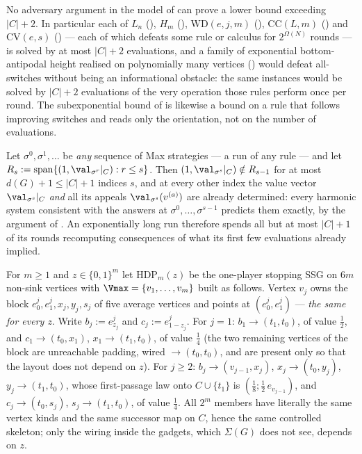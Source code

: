 \begin{corollary}\label{cor:qm-nobarrier}
No adversary argument in the model of  can prove a
lower bound exceeding $|C|+2$.  In particular each of $L_n$
(), $H_m$ (), $\mathrm{WD}(e,j,m)$
(), $\mathrm{CC}(L,m)$ ()
and $\mathrm{CV}(e,s)$ () --- each of which defeats some
rule or calculus for $2^{\Omega(N)}$ rounds --- is solved by at most
$|C|+2$ evaluations, and a family of exponential bottom-antipodal height
realised on polynomially many vertices () would
defeat all-switches without being an informational obstacle: the same
instances would be solved by $|C|+2$ evaluations of the very operation
those rules perform once per round.  The subexponential bound of
 is likewise a bound on a rule that follows improving
switches and reads only the orientation, not on the number of evaluations.
\end{corollary}

\begin{corollary}\label{cor:qm-runs}
Let $\sigma^{0},\sigma^{1},\dots$ be \emph{any} sequence of Max strategies
--- a run of any rule --- and let
$R_s:=\operatorname{span}\{(1,\val_{\sigma^{r}}|_C):r\le s\}$.  Then
$(1,\val_{\sigma^{s}}|_C)\notin R_{s-1}$ for at most $d(G)+1\le|C|+1$
indices $s$, and at every other index the value vector $\val_{\sigma^{s}}|_C$
\emph{and} all its appeals $\val_{\sigma^{s}}(v^{(a)})$ are already
determined: every harmonic system consistent with the answers at
$\sigma^{0},\dots,\sigma^{s-1}$ predicts them exactly, by the argument of
.  An exponentially long run therefore spends all but at
most $|C|+1$ of its rounds recomputing consequences of what its first few
evaluations already implied.
\end{corollary}

\begin{definition}\label{def:qm-hdp}
For $m\ge1$ and $z\in\{0,1\}^{m}$ let $\mathrm{HDP}_m(z)$ be the one-player
stopping SSG on $6m$ non-sink vertices with $\Vmax=\{v_1,\dots,v_m\}$
built as follows.  Vertex $v_j$ owns the block
$e^{j}_0,e^{j}_1,x_j,y_j,s_j$ of five average vertices and points at
$(e^{j}_0,e^{j}_1)$ --- \emph{the same for every $z$}.  Write
$b_j:=e^{j}_{z_j}$ and $c_j:=e^{j}_{1-z_j}$.  For $j=1$:
$b_1\to(t_1,t_0)$, of value $\tfrac12$, and $c_1\to(t_0,x_1)$,
$x_1\to(t_1,t_0)$, of value $\tfrac14$ (the two remaining vertices of the
block are unreachable padding, wired $\to(t_0,t_0)$, and are present only
so that the layout does not depend on $z$).  For $j\ge2$:
$b_j\to(v_{j-1},x_j)$, $x_j\to(t_0,y_j)$, $y_j\to(t_1,t_0)$, whose
first-passage law onto $C\cup\{t_1\}$ is $(\tfrac18;\tfrac12\,e_{v_{j-1}})$,
and $c_j\to(t_0,s_j)$, $s_j\to(t_1,t_0)$, of value $\tfrac14$.  All
$2^{m}$ members have literally the same vertex kinds and the same
successor map on $C$, hence the same controlled skeleton; only the wiring
inside the gadgets, which $\Sigma(G)$ does not see, depends on $z$.
\end{definition}

